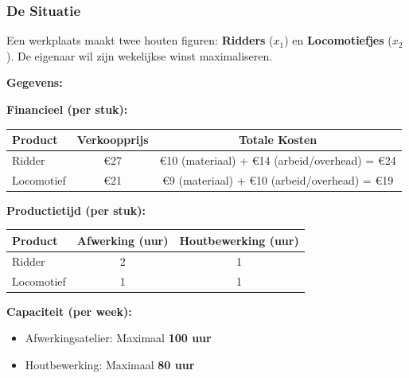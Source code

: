 \documentclass[a4paper,11pt]{article}
\begin{document}
\begin{oefenblok}

    \subsubsection*{De Situatie}
    Een werkplaats maakt twee houten figuren: \textbf{Ridders} ($x_1$) en \textbf{Locomotiefjes} ($x_2$).
    De eigenaar wil zijn wekelijkse winst maximaliseren.

    \textbf{Gegevens:}

    \textbf{Financieel (per stuk):}

    \begin{center}
        \begin{tabular}{|l|c|c|}
            \hline
            \textbf{Product} & \textbf{Verkoopprijs} & \textbf{Totale Kosten}                        \\
            \hline
            Ridder           & €27                   & €10 (materiaal) + €14 (arbeid/overhead) = €24 \\
            \hline
            Locomotief       & €21                   & €9 (materiaal) + €10 (arbeid/overhead) = €19  \\
            \hline
        \end{tabular}
    \end{center}

    \textbf{Productietijd (per stuk):}

    \begin{center}
        \begin{tabular}{|l|c|c|}
            \hline
            \textbf{Product} & \textbf{Afwerking (uur)} & \textbf{Houtbewerking (uur)} \\
            \hline
            Ridder           & 2                        & 1                            \\
            \hline
            Locomotief       & 1                        & 1                            \\
            \hline
        \end{tabular}
    \end{center}

    \textbf{Capaciteit (per week):}
    \begin{itemize}
        \item Afwerkingsatelier: Maximaal \textbf{100 uur}
        \item Houtbewerking: Maximaal \textbf{80 uur}
    \end{itemize}


\end{oefenblok}
\end{document}
